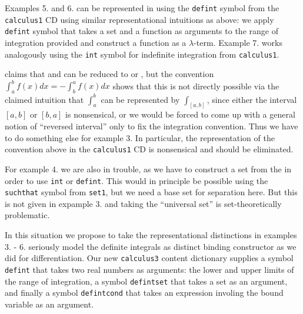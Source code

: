 \documentclass[12pt]{article}
\begin{document}
Examples 5. and 6. can be represented in {\openmath} using the {\texttt{defint}} symbol
from the {\texttt{calculus1}} CD using similar representational intuitions as above: we
apply {\texttt{defint}} symbol that takes a set and a function as arguments to the range
of integration provided and construct a function as a $\lambda$-term. Example 7. works
analogously using the {\texttt{int}} symbol for indefinite integration from
{\texttt{calculus1}}.

{} claims that {} and {} can be reduced to
{} or {}, but the convention
$\int_a^bf(x)dx=-\int_b^af(x)dx$ shows that this is not directly possible via the claimed
intuition that $\int_a^b$ can be represented by $\int_{[a,b]}$, since either the interval
$[a,b]$ or $[b,a]$ is nonsensical, or we would be forced to come up with a general notion
of ``reversed interval'' only to fix the integration convention. Thus we have to do
something else for example 3. In particular, the {} representation of the
convention above in the {\texttt{calculus1}} CD is nonsensical and should be eliminated.

For example 4. we are also in trouble, as we have to construct a set from the
{} in order to use {\texttt{int}} or {\texttt{defint}}. This would in
principle be possible using the {\texttt{suchthat}} symbol from {\texttt{set1}}, but we
need a base set for separation here. But this is not given in expample 3. and taking the
``universal set'' is set-theoretically problematic.

In this situation we propose to take the representational distinctions in examples 3. -
6. seriously model the definite integrals as distinct binding constructor as we did for
differentiation. Our new {\texttt{calculus3}} content dictionary supplies a symbol
{\texttt{defint}} that takes two real numbers as arguments: the lower and upper limits of
the range of integration, a symbol {\texttt{defintset}} that takes a set as an argument,
and finally a symbol {\texttt{defintcond}} that takes an expression involing the bound
variable as an argument. 
\end{document}
